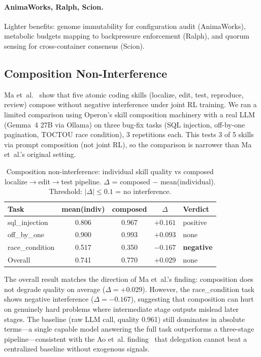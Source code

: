 \paragraph{AnimaWorks, Ralph, Scion.}
Lighter benefits: genome immutability for configuration audit
(AnimaWorks), metabolic budgets mapping to backpressure enforcement
(Ralph), and quorum sensing for cross-container consensus (Scion).

\subsection{Composition Non-Interference}

Ma et~al.~\cite{ma2026atomic} show that five atomic coding skills
(localize, edit, test, reproduce, review) compose without negative
interference under joint RL training.  We ran a limited comparison
using Operon's skill composition machinery with a real LLM (Gemma~4
27B via Ollama) on three bug-fix tasks (SQL injection, off-by-one
pagination, TOCTOU race condition), 3 repetitions each.  This tests
3 of 5 skills via prompt composition (not joint RL), so the comparison
is narrower than Ma et~al.'s original setting.

\begin{table}[h]
\caption{Composition non-interference: individual skill quality vs
composed localize$\to$edit$\to$test pipeline.  $\Delta$ =
composed $-$ mean(individual).  Threshold: $|\Delta| \leq 0.1$
= no interference.}
\label{tab:composition}
\centering
\small
\begin{tabular}{lcccl}
\toprule
Task & mean(indiv) & composed & $\Delta$ & Verdict \\
\midrule
sql\_injection & 0.806 & 0.967 & $+0.161$ & positive \\
off\_by\_one & 0.900 & 0.993 & $+0.093$ & none \\
race\_condition & 0.517 & 0.350 & $-0.167$ & \textbf{negative} \\
\midrule
Overall & 0.741 & 0.770 & $+0.029$ & none \\
\bottomrule
\end{tabular}
\end{table}

The overall result matches the direction of Ma et~al.'s finding:
composition does not degrade quality on average ($\Delta = +0.029$).
However, the race\_condition task shows negative interference
($\Delta = -0.167$), suggesting that composition can hurt on
genuinely hard problems where intermediate stage outputs mislead
later stages.  The baseline (raw LLM call, quality 0.961) still
dominates in absolute terms---a single capable model answering the
full task outperforms a three-stage pipeline---consistent with
the Ao et~al. finding~\cite{ao2026delegation} that delegation cannot
beat a centralized baseline without exogenous signals.

